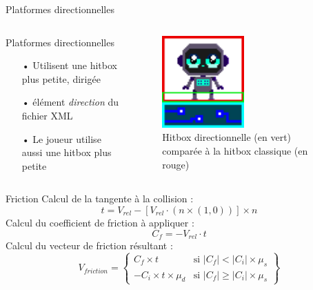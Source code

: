 \documentclass{beamer}
\begin{document}
{\begin{frame}{Platformes directionnelles}
    \begin{columns}
            \begin{block}{Platformes directionnelles}
                \begin{itemize}
                    \item[•] Utilisent une hitbox plus petite, dirigée
                    \item[•] élément \emph{direction} du fichier XML
                    \item[•] Le joueur utilise aussi une hitbox plus petite
                \end{itemize}
            \end{block}
            \begin{figure}
                \centering
                \includegraphics[width=0.5\textwidth]{images/DirectionnalHB.png}
                \caption{Hitbox directionnelle (en vert) comparée à la hitbox classique (en rouge)}
            \end{figure}
    \end{columns}
\end{frame}

\begin{frame}{Friction}
    Calcul de la tangente à la collision :
    \[t = V_{rel} - [V_{rel} \cdot (n \times (1,0))] \times n\]
    Calcul du coefficient de friction à appliquer :
    \[C_{f} = - V_{rel} \cdot t\]
    Calcul du vecteur de friction résultant :
    \[
        V_{friction} = \left\{\begin{array}{lr}
            C_{f} \times t & \text{si } |C_{f}| < |C_{i}| \times \mu_{s}\\
            -C_{i} \times t \times \mu_{d} & \text{si } |C_{f}| \geq |C_{i}| \times \mu_{s}
        \end{array}\right\}
    \]
\end{frame}

}
\end{document}
